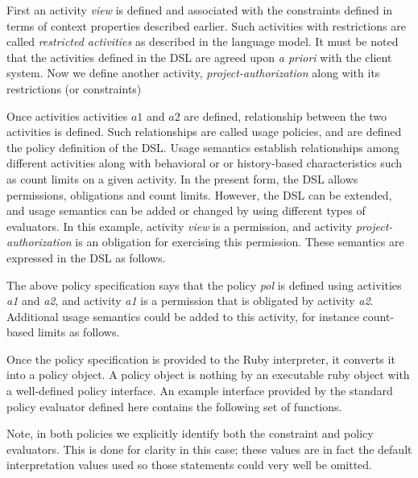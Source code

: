 First an activity {\em view} is defined and associated with the constraints defined in terms of context properties described earlier. Such activities with restrictions are called {\em restricted activities} as described in the language model. It must be noted that the activities defined in the DSL are agreed upon {\em a priori} with the client system. Now we define another activity, {\em project-authorization} along with its restrictions (or constraints)



Once activities activities $a1$ and $a2$ are defined, relationship between the two activities is defined. Such relationships are called usage policies, and are defined the policy definition of the DSL. Usage semantics establish relationships among different activities along with behavioral or or history-based characteristics such as count limits on a given activity. In the present form, the DSL allows permissions, obligations and count limits. However, the DSL can be extended, and usage semantics can be added or changed by using different types of evaluators. In this example, activity {\em view} is a permission, and activity {\em project-authorization} is an obligation for exercising this permission. These semantics are expressed in the DSL as follows. 



The above policy specification says that the policy {\em pol} is defined using activities {\em a1} and {\em a2}, and activity {\em a1} is a permission that is obligated by activity {\em a2}.  Additional usage semantics could be added to this activity, for instance count-based limits as follows. 



Once the policy specification is provided to the Ruby interpreter, it converts it into a policy object. A policy object is nothing by an executable ruby object with a well-defined policy interface. An example interface provided by the standard policy evaluator defined here contains the following set of functions.

Note, in both policies we explicitly identify both the constraint and policy evaluators.  This is done for clarity in this case; these values are in fact the default interpretation values used so those statements could very well be omitted.

